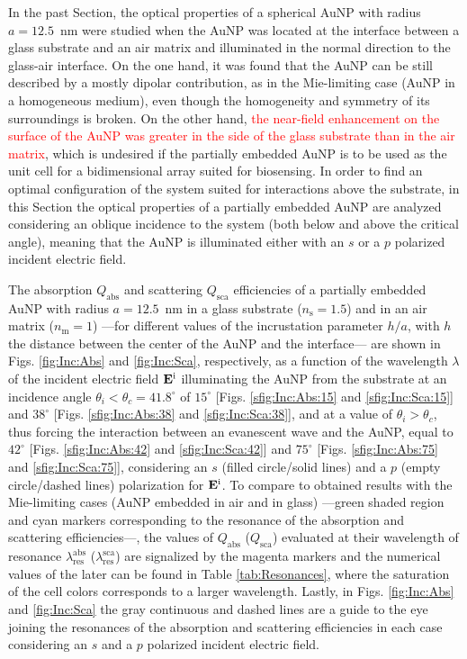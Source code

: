 
In the past Section, the optical properties of a spherical AuNP with radius $a = 12.5$~nm were studied when the AuNP was located at the interface between a glass substrate and an air matrix and illuminated in the normal direction to the glass-air interface. On the one hand, it was found that the AuNP can be still described by a mostly dipolar contribution, as in the Mie-limiting case (AuNP in a homogeneous medium), even though the homogeneity and symmetry of its surroundings is broken. On the other hand, \textcolor{red}{the near-field enhancement on  the surface of the AuNP was greater in the side of the glass substrate than in the air matrix}, which is undesired if the partially embedded AuNP is to be used as the unit cell for a bidimensional array suited for biosensing. In order to find an optimal configuration of the system suited for interactions above the substrate, in this Section the optical properties of a partially embedded AuNP are analyzed considering an oblique incidence to the system (both below and above the critical angle), meaning that the AuNP is illuminated either with an $s$ or a $p$ polarized incident electric field.

The absorption $Q_\text{abs}$ and scattering $Q_\text{sca}$ efficiencies of a partially embedded  AuNP with radius $a =12.5$~nm in a glass substrate ($n_\text{s} = 1.5$) and in an air matrix ($n_\text{m} = 1$) ---for different values of the incrustation parameter $h/a$, with $h$ the distance between the center of the AuNP and the interface--- are shown in Figs. \ref{fig:Inc:Abs} and \ref{fig:Inc:Sca}, respectively, as a function of the wavelength $\lambda$ of the incident electric field $\vb{E}^\text{i}$ illuminating the AuNP from the substrate at an incidence angle $\theta_i < \theta_c = 41.8^\circ$ of $15^\circ$ [Figs. \ref{sfig:Inc:Abs:15} and \ref{sfig:Inc:Sca:15}] and  $38^\circ$ [Figs. \ref{sfig:Inc:Abs:38} and \ref{sfig:Inc:Sca:38}], and  at a value of $\theta_i>\theta_c$, thus forcing the interaction between an evanescent wave and the AuNP, equal to $42^\circ$  [Figs. \ref{sfig:Inc:Abs:42} and \ref{sfig:Inc:Sca:42}] and $75^\circ$  [Figs. \ref{sfig:Inc:Abs:75} and \ref{sfig:Inc:Sca:75}], considering an $s$ (filled circle/solid lines) and a $p$ (empty circle/dashed lines) polarization for $\vb{E}^\text{i}$. To compare to obtained results with the Mie-limiting cases (AuNP embedded in air and in glass) ---green shaded region and cyan markers corresponding to the resonance of the absorption and scattering efficiencies---, the values of $Q_\text{abs}$ ($Q_\text{sca}$) evaluated at their wavelength of resonance $\lambda_\text{res}^\text{abs}$ ($\lambda_\text{res}^\text{sca}$) are signalized by the magenta markers and the numerical values of the later can be found in Table \ref{tab:Resonances}, where the saturation of the cell colors corresponds to a larger wavelength. Lastly, in Figs. \ref{fig:Inc:Abs} and \ref{fig:Inc:Sca} the gray continuous and dashed lines are a guide to the eye joining the resonances of the absorption and scattering efficiencies in each case considering an $s$ and a $p$ polarized incident electric field.

